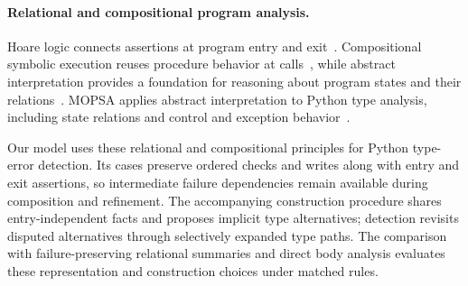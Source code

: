 \paragraph{Relational and compositional program analysis.}
Hoare logic connects assertions at program entry and exit~\cite{hoare1969axiomatic}. Compositional symbolic execution
reuses procedure behavior at calls~\cite{godefroid2007compositional}, while
abstract interpretation provides a foundation for reasoning about program
states and their relations~\cite{cousot1977abstract}. MOPSA applies abstract
interpretation to Python type analysis, including state relations and
control and exception behavior~\cite{monat2020python}.

Our model uses these relational and compositional principles for Python
type-error detection. Its cases preserve ordered checks and writes along
with entry and exit assertions, so intermediate failure dependencies remain
available during composition and refinement. The accompanying construction
procedure shares entry-independent facts and proposes implicit type
alternatives; detection revisits disputed alternatives through selectively
expanded type paths. The comparison with failure-preserving relational
summaries and direct body analysis evaluates these representation and
construction choices under matched rules.

